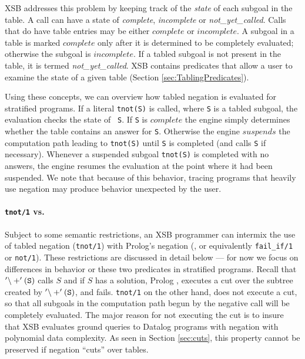 XSB addresses this problem by keeping track of the {\em state} of each
subgoal in the table.  A call can have a state of {\em complete}, {\em
incomplete} or {\em not\_yet\_called}.  
Calls that do have table entries may be either $complete$ or
$incomplete$.  A subgoal in a table is marked $complete$ only after it
is determined to be completely evaluated; otherwise the subgoal is
$incomplete$.  If a tabled subgoal is not present in the table, it is
termed {\em not\_yet\_called}.  XSB contains predicates that allow a
user to examine the state of a given table (Section
\ref{sec:TablingPredicates}).

Using these concepts, we can overview how tabled negation is evaluated
for stratified programs.  If a literal {\tt tnot(S)} is called, where
{\tt S} is a tabled subgoal, the evaluation checks the state of {\tt
S}.  If {\tt S} is $complete$ the engine simply determines whether the
table contains an answer for {\tt S}.  Otherwise the engine $suspends$
the computation path leading to {\tt tnot(S)} until {\tt S} is
completed (and calls {\tt S} if necessary).  Whenever a suspended
subgoal {\tt tnot(S)} is completed with no answers, the engine resumes
the evaluation at the point where it had been suspended.  We note that
because of this behavior, tracing programs that heavily use negation
may produce behavior unexpected by the user.


\paragraph*{{\tt tnot/1} vs. \not }
\index{\not}

Subject to some semantic restrictions, an XSB programmer can intermix
the use of tabled negation ({\tt tnot/1}) with Prolog's negation
(\not, or equivalently {\tt fail\_if/1} or {\tt not/1}).  These
restrictions are discussed in detail below --- for now we focus on
differences in behavior or these two predicates in stratified
programs.  Recall that ${\tt '\backslash+'(S)}$ calls $S$ and if $S$
has a solution, Prolog , executes a cut over the subtree created by
${\tt '\backslash+'(S)}$, and fails.  {\tt tnot/1} on the other hand,
does not execute a cut, so that all subgoals in the computation path
begun by the negative call will be completely evaluated.  The major
reason for not executing the cut is to insure that XSB evaluates
ground queries to Datalog programs with negation with polynomial data
complexity.  As seen in Section \ref{sec:cuts}, this property cannot
be preserved if negation ``cuts'' over tables.

